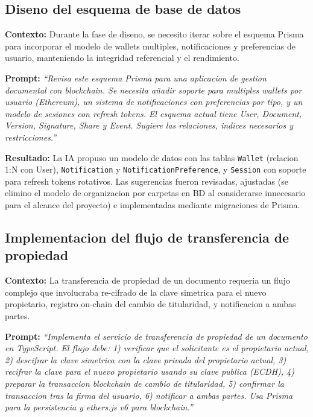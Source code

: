 \documentclass[11pt, a4paper]{article}
\begin{document}
\subsection{Diseno del esquema de base de datos}

\textbf{Contexto:} Durante la fase de diseno, se necesito iterar sobre el esquema Prisma para incorporar el modelo de wallets multiples, notificaciones y preferencias de usuario, manteniendo la integridad referencial y el rendimiento.

\textbf{Prompt:} \textit{``Revisa este esquema Prisma para una aplicacion de gestion documental con blockchain. Se necesita añadir soporte para multiples wallets por usuario (Ethereum), un sistema de notificaciones con preferencias por tipo, y un modelo de sesiones con refresh tokens. El esquema actual tiene User, Document, Version, Signature, Share y Event. Sugiere las relaciones, indices necesarios y restricciones.''}

\textbf{Resultado:} La IA propuso un modelo de datos con las tablas \texttt{Wallet} (relacion 1:N con User), \texttt{Notification} y \texttt{NotificationPreference}, y \texttt{Session} con soporte para refresh tokens rotativos. Las sugerencias fueron revisadas, ajustadas (se elimino el modelo de organizacion por carpetas en BD al considerarse innecesario para el alcance del proyecto) e implementadas mediante migraciones de Prisma.

\subsection{Implementacion del flujo de transferencia de propiedad}

\textbf{Contexto:} La transferencia de propiedad de un documento requeria un flujo complejo que involucraba re-cifrado de la clave simetrica para el nuevo propietario, registro on-chain del cambio de titularidad, y notificacion a ambas partes.

\textbf{Prompt:} \textit{``Implementa el servicio de transferencia de propiedad de un documento en TypeScript. El flujo debe: 1) verificar que el solicitante es el propietario actual, 2) descifrar la clave simetrica con la clave privada del propietario actual, 3) recifrar la clave para el nuevo propietario usando su clave publica (ECDH), 4) preparar la transaccion blockchain de cambio de titularidad, 5) confirmar la transaccion tras la firma del usuario, 6) notificar a ambas partes. Usa Prisma para la persistencia y ethers.js v6 para blockchain.''}
\end{document}
